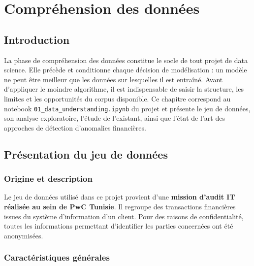 \chapter{Compréhension des données}

\section*{Introduction}

La phase de compréhension des données constitue le socle de tout projet de data science.
Elle précède et conditionne chaque décision de modélisation : un modèle ne peut être meilleur
que les données sur lesquelles il est entraîné. Avant d'appliquer le moindre algorithme,
il est indispensable de saisir la structure, les limites et les opportunités du corpus
disponible. Ce chapitre correspond au notebook \texttt{01\_data\_understanding.ipynb} du
projet et présente le jeu de données, son analyse exploratoire, l'étude de l'existant,
ainsi que l'état de l'art des approches de détection d'anomalies financières.

\section{Présentation du jeu de données}

\subsection{Origine et description}

Le jeu de données utilisé dans ce projet provient d'une \textbf{mission d'audit IT réalisée
au sein de PwC Tunisie}. Il regroupe des transactions financières issues du système
d'information d'un client. Pour des raisons de confidentialité, toutes les informations
permettant d'identifier les parties concernées ont été anonymisées.

\subsection{Caractéristiques générales}

